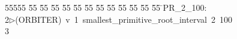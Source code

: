 %
%
\begin{tabbing}
55555 \= 55 \= 55 \= 55 \= 55 \= 55 \= 55 \= 55 \= 55 \= 55 \= 55 \= 55 \= 55 \= \>PR\_2\_100:\\[0pt]
2\>$\triangleright$\>(ORBITER)\ v\ 1\ smallest\_primitive\_root\_interval\ 2\ 100\\[0pt]
3\>\end{tabbing}

